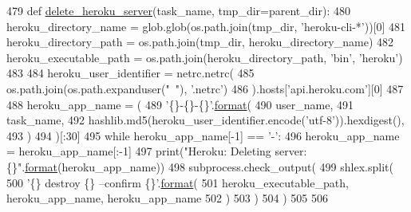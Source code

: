 \begin{DoxyCode}
479 \textcolor{keyword}{def }\hyperlink{namespaceparlai_1_1mturk_1_1core_1_1server__utils_a8dfde882f9d6ff492ca565ae2334fc70}{delete\_heroku\_server}(task\_name, tmp\_dir=parent\_dir):
480     heroku\_directory\_name = glob.glob(os.path.join(tmp\_dir, \textcolor{stringliteral}{'heroku-cli-*'}))[0]
481     heroku\_directory\_path = os.path.join(tmp\_dir, heroku\_directory\_name)
482     heroku\_executable\_path = os.path.join(heroku\_directory\_path, \textcolor{stringliteral}{'bin'}, \textcolor{stringliteral}{'heroku'})
483 
484     heroku\_user\_identifier = netrc.netrc(
485         os.path.join(os.path.expanduser(\textcolor{stringliteral}{"~"}), \textcolor{stringliteral}{'.netrc'})
486     ).hosts[\textcolor{stringliteral}{'api.heroku.com'}][0]
487 
488     heroku\_app\_name = (
489         \textcolor{stringliteral}{'\{\}-\{\}-\{\}'}.\hyperlink{namespaceparlai_1_1chat__service_1_1services_1_1messenger_1_1shared__utils_a32e2e2022b824fbaf80c747160b52a76}{format}(
490             user\_name,
491             task\_name,
492             hashlib.md5(heroku\_user\_identifier.encode(\textcolor{stringliteral}{'utf-8'})).hexdigest(),
493         )
494     )[:30]
495     \textcolor{keywordflow}{while} heroku\_app\_name[-1] == \textcolor{stringliteral}{'-'}:
496         heroku\_app\_name = heroku\_app\_name[:-1]
497     print(\textcolor{stringliteral}{"Heroku: Deleting server: \{\}"}.\hyperlink{namespaceparlai_1_1chat__service_1_1services_1_1messenger_1_1shared__utils_a32e2e2022b824fbaf80c747160b52a76}{format}(heroku\_app\_name))
498     subprocess.check\_output(
499         shlex.split(
500             \textcolor{stringliteral}{'\{\} destroy \{\} --confirm \{\}'}.\hyperlink{namespaceparlai_1_1chat__service_1_1services_1_1messenger_1_1shared__utils_a32e2e2022b824fbaf80c747160b52a76}{format}(
501                 heroku\_executable\_path, heroku\_app\_name, heroku\_app\_name
502             )
503         )
504     )
505 
506 
\end{DoxyCode}
\mbox{\label{namespaceparlai_1_1mturk_1_1core_1_1legacy__2018_1_1server__utils_a3c61040126aa824789e9d5cda8eee18f}} 
